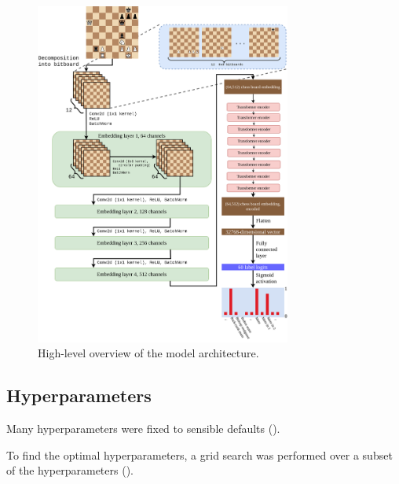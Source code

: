 \begin{figure}[H]
  \centering
  \includegraphics[width=0.75\textwidth]{project/img/ml_diagram.png}
  \caption{High-level overview of the model architecture.}
  \label{MLDiagram}
\end{figure}

\subsection{Hyperparameters}\label{mlS22}

Many hyperparameters were fixed to sensible defaults ().

To find the optimal hyperparameters, a grid search was performed over a subset
of the hyperparameters ().

